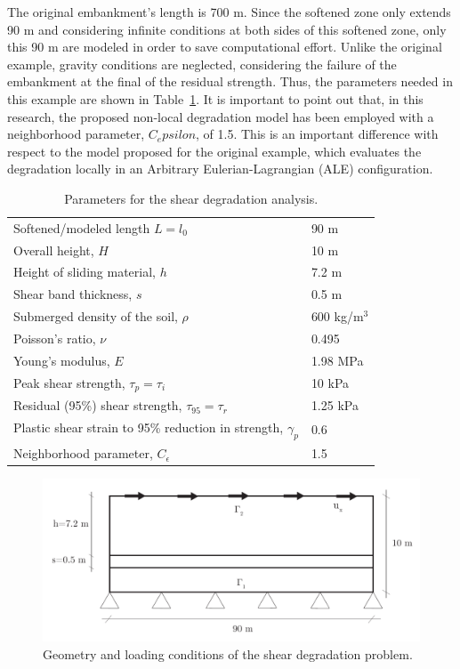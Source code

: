 \documentclass[applsci,journal,article,submit,moreauthors,pdftex]{Definitions/mdpi}
\begin{document}
The original embankment's length is 700 m. Since the softened zone only extends 90 m and considering infinite conditions at both sides of this softened zone, only this 90 m are modeled in order to save computational effort. Unlike the original example, gravity conditions are neglected, considering the failure of the embankment at the final  of the residual strength. Thus, the parameters needed in this example are shown in Table~\ref{tab2}. It is important to point out that, in this research, the proposed non-local degradation model has been employed with a neighborhood parameter, $C_epsilon$, of 1.5. This is an important difference with respect to the model proposed for the original example, which evaluates the degradation locally in an Arbitrary Eulerian-Lagrangian (ALE) configuration.

\begin{table}
\caption{\label{tab2} Parameters for the shear degradation analysis.} 
\centering
	\begin{tabular}{ll}
	 Softened/modeled length $L=l_0$ & 	 90 m \\
	 Overall height, $H$ & 10 m \\
	 Height of sliding material, $h$ & 7.2 m \\
	 Shear band thickness, $s$ & 0.5 m \\
	 Submerged density of the soil, $\rho$ & 600 kg/m$^3$ \\
	 Poisson's ratio, $\nu$ & 0.495 \\
	 Young's modulus, $E$ & 1.98 MPa \\
	 Peak shear strength, $\tau_p=\tau_i$ & 10 kPa \\
	 Residual (95\%) shear strength, $\tau_{95}=\tau_r$ & 1.25 kPa \\
	 Plastic shear strain to 95\% reduction in strength, $\gamma_p$ & 0.6 \\
	 Neighborhood parameter, $C_\epsilon$ & 1.5
	\end{tabular}
\end{table}

\begin{figure}[!t]
\begin{center}
\includegraphics[width=12cm]{Figs/geo_shear.pdf}
\caption{Geometry and loading conditions of the shear degradation problem.}
\label{fig_geoshear}
\end{center}
\end{figure}
\end{document}
